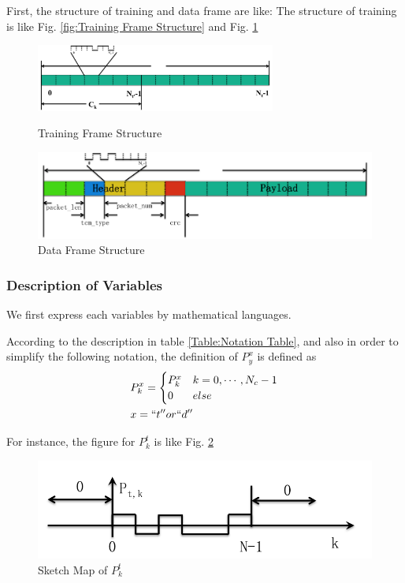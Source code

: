 \documentclass[a4paper]{report}
\begin{document}
First, the structure of training and data frame are like:
The structure of training is like Fig. \ref{fig:Training Frame Structure} and Fig. \ref{fig:Data Frame Structure}
\begin{figure}[ht]
	\centering
	\includegraphics[width = 3.1in]{figure/training_frame.png}
	\caption{Training Frame Structure}
	\label{fig:Training Frame Structure}
	\includegraphics[width = 3.1 in]{figure/data_frame.png}
	\caption{Data Frame Structure}
	\label{fig:Data Frame Structure}
\end{figure}

\subsubsection{Description of Variables} %
\label{ssub:description_of_variables}
We first express each variables by mathematical languages.

According to the description in table \ref{Table:Notation Table}, and also in order to simplify the following notation, the definition of $P^x_y$ is defined as 
\begin{equation}
\begin{split}
	&P^x_k = 
	\begin{cases}
		P^x_k 	& k = 0, \cdots, N_c-1\\
		0 			& else
	\end{cases}\\
	&x = ``t'' or ``d''
\end{split}
\end{equation}

For instance, the figure for $P^t_k$ is like Fig. \ref{fig:Sketch Map of P_tk}
\begin{figure}
	\centering
	\includegraphics[width = 3.1 in]{figure/p_t_k.png}
	\caption{Sketch Map of $P^t_k$}
	\label{fig:Sketch Map of P_tk}
\end{figure}
\end{document}
